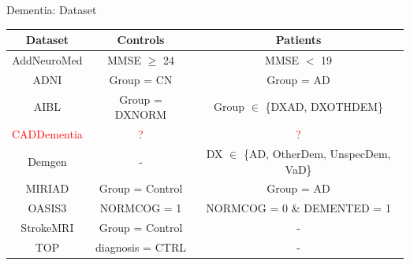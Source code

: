 \documentclass[c]{beamer}
\begin{document}
	\begin{frame}{Dementia: Dataset} %
		\centering
	    \begin{tabular}{|c|c|c|}
            \hline
             \textbf{\scriptsize{Dataset}}&\textbf{\scriptsize{Controls}}&\textbf{\scriptsize{Patients}}\\
            \hline
            \scriptsize{AddNeuroMed}&\scriptsize{MMSE $\geq$ 24}&\scriptsize{MMSE $<$ 19}\\
            \hline
            \scriptsize{ADNI}&\scriptsize{Group = CN}&\scriptsize{Group = AD}\\
            \hline
            \scriptsize{AIBL}&\scriptsize{Group = DXNORM}&\scriptsize{Group $\in$ \{DXAD, DXOTHDEM\}}\\
            \hline
            \scriptsize{\textcolor{red}{CADDementia}}&\scriptsize{\textcolor{red}{?}}&\scriptsize{\textcolor{red}{?}}\\
            \hline
            \scriptsize{Demgen}&\scriptsize{-}&\scriptsize{DX $\in$ \{AD, OtherDem, UnspecDem, VaD\}}\\
            \hline
            \scriptsize{MIRIAD}&\scriptsize{Group = Control}&\scriptsize{Group = AD}\\
            \hline
            \scriptsize{OASIS3}&\scriptsize{NORMCOG = 1}&\scriptsize{NORMCOG = 0 \& DEMENTED = 1}\\
            \hline
            \scriptsize{StrokeMRI}&\scriptsize{Group = Control}&\scriptsize{-}\\
            \hline
            \scriptsize{TOP}&\scriptsize{diagnosis = CTRL}&\scriptsize{-}\\
            \hline
        \end{tabular}
	\end{frame}	
	
\end{document}
